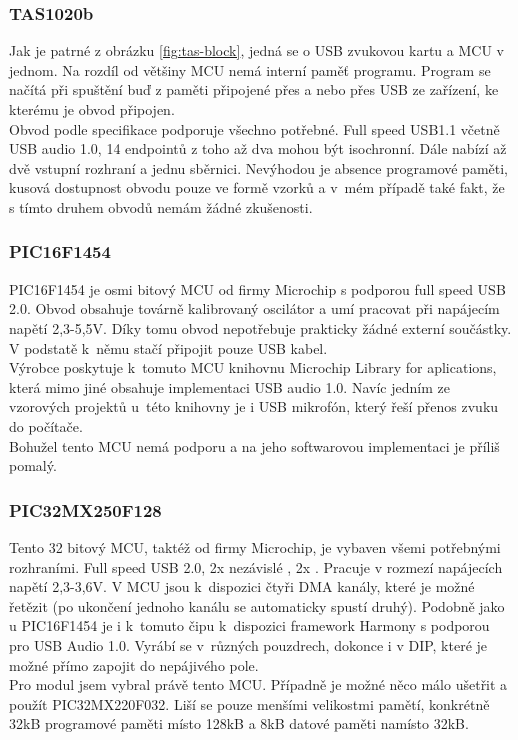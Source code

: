 \subsubsection{TAS1020b}	

Jak je patrné z obrázku \ref{fig:tas-block}, jedná se o USB \iis zvukovou kartu a MCU v jednom. Na rozdíl od většiny MCU nemá interní paměť programu. Program se načítá při spuštění buď z \eeprom paměti připojené přes \iic a nebo přes USB ze zařízení, ke kterému je obvod připojen.\\
Obvod podle specifikace \cite{tas} podporuje všechno potřebné. Full speed USB1.1 včetně USB audio 1.0, 14 endpointů z toho až dva mohou být isochronní. Dále nabízí až dvě vstupní \iis rozhraní a jednu \iic sběrnici. Nevýhodou je absence programové paměti, kusová dostupnost obvodu pouze ve formě vzorků a v~mém případě také fakt, že s tímto druhem obvodů nemám žádné zkušenosti.

\subsubsection{PIC16F1454}
PIC16F1454 je osmi bitový MCU od firmy Microchip s podporou full speed USB 2.0. Obvod obsahuje továrně kalibrovaný oscilátor a umí pracovat při napájecím napětí 2,3-5,5V. Díky tomu obvod nepotřebuje prakticky žádné externí součástky. V podstatě k~němu stačí připojit pouze USB kabel.\\
Výrobce poskytuje k~tomuto MCU knihovnu Microchip Library for aplications, která mimo jiné obsahuje implementaci USB audio 1.0. Navíc jedním ze vzorových projektů u~této knihovny je i USB mikrofón, který řeší přenos zvuku do počítače.\\
Bohužel tento MCU nemá podporu \iis a na jeho softwarovou implementaci je příliš pomalý. 

\subsubsection{PIC32MX250F128}
Tento 32 bitový MCU, taktéž od firmy Microchip, je vybaven všemi potřebnými rozhraními. Full speed USB 2.0, 2x nezávislé \iis, 2x \iic. Pracuje v rozmezí napájecích napětí 2,3-3,6V. V MCU jsou k~dispozici čtyři DMA kanály, které je možné řetězit (po ukončení jednoho kanálu se automaticky spustí druhý). Podobně jako u PIC16F1454 je i k~tomuto čipu k~dispozici framework Harmony \cite{harmony} s podporou pro USB Audio 1.0. Vyrábí se v~různých pouzdrech, dokonce i v DIP, které je možné přímo zapojit do nepájivého pole.\\
Pro modul jsem vybral právě tento MCU. Případně je možné něco málo ušetřit a použít PIC32MX220F032. Liší se pouze menšími velikostmi pamětí, konkrétně 32kB programové paměti místo 128kB a 8kB datové paměti namísto 32kB.

